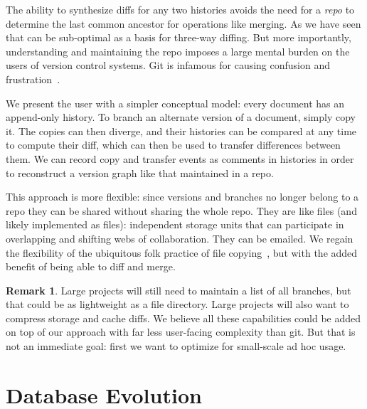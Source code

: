 \documentclass[english,submission]{programming}
\theoremstyle{definition}
\newtheorem*{remark}{Remark}
\begin{document}
The ability to synthesize diffs for any two histories avoids the need for a \textit{repo} to determine the last common ancestor for operations like merging. As we have seen that can be sub-optimal as a basis for three-way diffing. But more importantly, understanding and maintaining the repo imposes a large mental burden on the users of version control systems. Git is infamous for causing confusion and frustration~\cite{perez13, church2014case, xkcd1597}.

We present the user with a simpler conceptual model: every document has an append-only history. To branch an alternate version of a document, simply copy it. The copies can then diverge, and their histories can be compared at any time to compute their diff, which can then be used to transfer differences between them. We can record copy and transfer events as comments in histories in order to reconstruct a version graph like that maintained in a repo.

This approach is more flexible: since versions and branches no longer belong to a repo they can be shared without sharing the whole repo. They are like files (and likely implemented as files): independent storage units that can participate in overlapping and shifting webs of collaboration. They can be emailed. We regain the flexibility of the ubiquitous folk practice of file copying~\cite{Burnett14, Basman19}, but with the added benefit of being able to diff and merge.

\begin{remark}
  Large projects will still need to maintain a list of all branches, but that could be as lightweight as a file directory. Large projects will also want to compress storage and cache diffs. We believe all these capabilities could be added on top of our approach with far less user-facing complexity than git. But that is not an immediate goal: first we want to optimize for small-scale ad hoc usage.
\end{remark}





\section{Database Evolution}\label{db-evolution}
\end{document}
